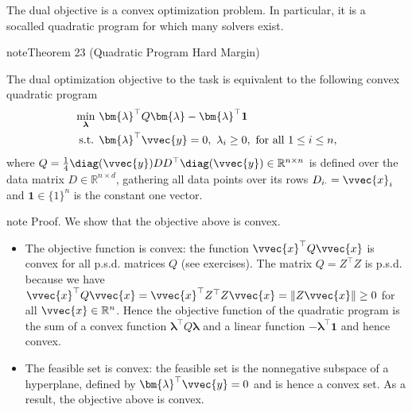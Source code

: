 \documentclass[letterpaper,10pt,english]{jupyterBook}
\begin{document}
\sphinxAtStartPar
The dual objective is a convex optimization problem. In particular, it is a so\sphinxhyphen{}called quadratic program for which many solvers exist.
\label{classification_svms:theorem-4}
\begin{sphinxadmonition}{note}{Theorem 23 (Quadratic Program Hard Margin)}



\sphinxAtStartPar
The dual optimization objective to the {\hyperref[\detokenize{classification_svms:hard-margin-svm-task}]{}} task is equivalent to the following convex quadratic program
\begin{equation}\label{equation:classification_svms:svm_dual_quadr}
\begin{split}\begin{align*}
\min_{\boldsymbol{\lambda}}\ &  \bm{\lambda}^\top Q\bm{\lambda} - \bm{\lambda}^\top\mathbf{1} \\
\text{s.t. } &  \bm{\lambda}^\top \vvec{y} = 0,\ 
\lambda_{i}\geq 0, \text{ for all } 1\leq i\leq n,
\end{align*}\end{split}
\end{equation}
\sphinxAtStartPar
where \(Q=\frac14 \diag(\vvec{y})DD^\top\diag(\vvec{y})\in\mathbb{R}^{n\times n}\) is defined over the data matrix \(D\in\mathbb{R}^{n\times d}\), gathering all data points over its rows \(D_{i\cdot}=\vvec{x}_i\) and \(\mathbf{1}\in\{1\}^n\) is the constant one vector.
\end{sphinxadmonition}

\begin{sphinxadmonition}{note}
\sphinxAtStartPar
Proof. We show that the objective above is convex.
\begin{itemize}
\item {} 
\sphinxAtStartPar
The objective function is convex: the function \(\vvec{x}^\top Q\vvec{x}\) is convex for all p.s.d. matrices \(Q\) (see exercises). The matrix \(Q=Z^\top Z\) is p.s.d. because we have \(\vvec{x}^\top Q\vvec{x}=\vvec{x}^\top Z^\top Z\vvec{x}=\lVert Z\vvec{x}\rVert\geq 0\) for all \(\vvec{x}\in\mathbb{R}^{n}\). Hence the objective function of the quadratic program is the sum of a convex function \(\bm{\lambda}^\top Q\bm{\lambda}\) and a linear function \(-\bm{\lambda}^\top\mathbf{1}\) and hence convex.

\item {} 
\sphinxAtStartPar
The feasible set is convex: the feasible set is the nonnegative subspace of a hyperplane, defined by \(\bm{\lambda}^\top\vvec{y}=0\) and is hence a convex set. As a result, the objective above is convex.

\end{itemize}
\end{sphinxadmonition}
\end{document}
